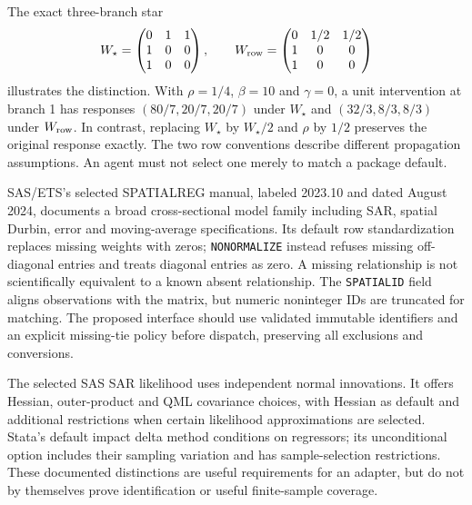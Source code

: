 The exact three-branch star
\begin{equation}
 W_\star=\begin{pmatrix}0&1&1\\1&0&0\\1&0&0\end{pmatrix},\qquad
 W_{\rm row}=\begin{pmatrix}0&1/2&1/2\\1&0&0\\1&0&0\end{pmatrix}
 \label{exec20:network-normalization}
\end{equation}
illustrates the distinction. With $\rho=1/4$, $\beta=10$ and $\gamma=0$, a unit
intervention at branch 1 has responses $(80/7,20/7,20/7)$ under $W_\star$ and
$(32/3,8/3,8/3)$ under $W_{\rm row}$. In contrast, replacing $W_\star$ by
$W_\star/2$ and $\rho$ by $1/2$ preserves the original response exactly.
The two row conventions describe different propagation assumptions. An agent
must not select one merely to match a package default.
\citep{exec20_network_reference}

SAS/ETS's selected SPATIALREG manual, labeled 2023.10 and dated August 2024,
documents a broad cross-sectional model family including SAR, spatial Durbin,
error and moving-average specifications. Its default row standardization
replaces missing weights with zeros; \texttt{NONORMALIZE} instead refuses missing
off-diagonal entries and treats diagonal entries as zero. A missing relationship
is not scientifically equivalent to a known absent relationship. The
\texttt{SPATIALID} field aligns observations with the matrix, but numeric
noninteger IDs are truncated for matching. The proposed interface should use
validated immutable identifiers and an explicit missing-tie policy before
dispatch, preserving all exclusions and conversions.
\citep{exec20_network_sas_latest_spatial}

The selected SAS SAR likelihood uses independent normal innovations. It offers
Hessian, outer-product and QML covariance choices, with Hessian as default and
additional restrictions when certain likelihood approximations are selected.
Stata's default impact delta method conditions on regressors; its unconditional
option includes their sampling variation and has sample-selection restrictions.
These documented distinctions are useful requirements for an adapter, but
do not by themselves prove identification or useful finite-sample coverage.
\citep{exec20_network_sas_latest_spatial,exec20_network_stata_impacts}

